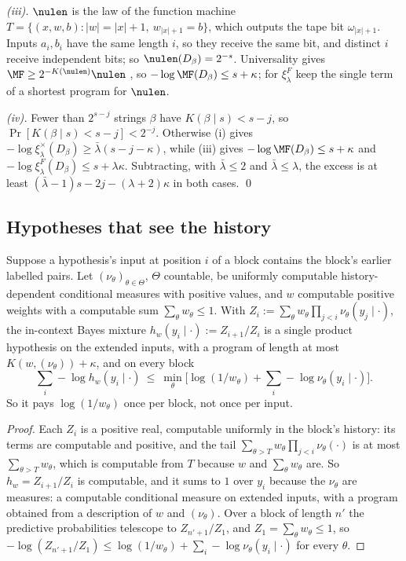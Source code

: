 \emph{(iii).} $\nulen$ is the law of the function machine $T=\{(x,w,b):|w|=|x|+1,\ w_{|x|+1}=b\}$, which outputs the tape bit $\omega_{|x|+1}$. Inputs $a_i,b_i$ have the same length $i$, so they receive the same bit, and distinct $i$ receive independent bits; so $\nulen(D_\beta)=2^{-s}$. Universality gives $\MF\ge2^{-K(\nulen)}\nulen$ \citep[Theorem~3.8]{claudeSFI2026fundamentals}, so $-\log\MF(D_\beta)\le s+\kappa$; for $\xi^F_\lambda$ keep the single term of a shortest program for $\nulen$.%

\emph{(iv).} Fewer than $2^{s-j}$ strings $\beta$ have $K(\beta\mid s)<s-j$, so $\Pr[K(\beta\mid s)<s-j]<2^{-j}$. Otherwise (i) gives $-\log\xi^\times_\lambda(D_\beta)\ge\bar\lambda(s-j-\kappa)$, while (iii) gives $-\log\MF(D_\beta)\le s+\kappa$ and $-\log\xi^F_\lambda(D_\beta)\le s+\lambda\kappa$. Subtracting, with $\bar\lambda\le2$ and $\bar\lambda\le\lambda$, the excess is at least $(\bar\lambda-1)s-2j-(\lambda+2)\kappa$ in both cases. \qed

\subsection{Hypotheses that see the history}\label{app:absorb:history}

\begin{proposition}\label{prop:absorb:history}
Suppose a hypothesis's input at position $i$ of a block contains the block's earlier labelled pairs. Let $(\nu_\theta)_{\theta\in\Theta}$, $\Theta$ countable, be uniformly computable history-dependent conditional measures with positive values, and $w$ computable positive weights with a computable sum $\sum_\theta w_\theta\le1$. With $Z_i:=\sum_\theta w_\theta\prod_{j<i}\nu_\theta(y_j\mid\cdot)$, the in-context Bayes mixture $h_w(y_i\mid\cdot):=Z_{i+1}/Z_i$ is a single product hypothesis on the extended inputs, with a program of length at most $K(w,(\nu_\theta))+\kappa$, and on every block
\[
\textstyle\sum_i-\log h_w(y_i\mid\cdot)\ \le\ \min_\theta\big[\log(1/w_\theta)+\sum_i-\log\nu_\theta(y_i\mid\cdot)\big].
\]
So it pays $\log(1/w_\theta)$ once per block, not once per input.
\end{proposition}

\begin{proof} Each $Z_i$ is a positive real, computable uniformly in the block's history: its terms are computable and positive, and the tail $\sum_{\theta>T}w_\theta\prod_{j<i}\nu_\theta(\cdot)$ is at most $\sum_{\theta>T}w_\theta$, which is computable from $T$ because $w$ and $\sum_\theta w_\theta$ are. So $h_w=Z_{i+1}/Z_i$ is computable, and it sums to $1$ over $y_i$ because the $\nu_\theta$ are measures: a computable conditional measure on extended inputs, with a program obtained from a description of $w$ and $(\nu_\theta)$. Over a block of length $n'$ the predictive probabilities telescope to $Z_{n'+1}/Z_1$, and $Z_1=\sum_\theta w_\theta\le1$, so $-\log(Z_{n'+1}/Z_1)\le\log(1/w_\theta)+\sum_i-\log\nu_\theta(y_i\mid\cdot)$ for every $\theta$.
\end{proof}

